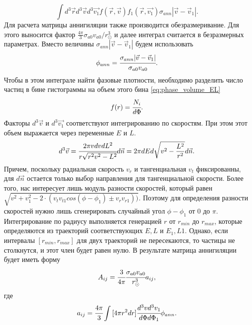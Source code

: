 \begin{equation}
	\label{eq:ann_st}
	\int{d^3\vec{r} d^3\vec{v}  d^3\vec{v_1} 
		f(\vec{r},\vec{v})f_1(\vec{r},\vec{v_1}) \sigma_{ann} 
		|\vec{v}-\vec{v}_1|}.
\end{equation}
Для расчета матрицы аннигиляции также производится обезразмеривание. Для этого выносится фактор $\frac{4\pi}{3}\sigma_{a0}v_{a0}/r_{\odot}^3$ и далее интеграл считается в безразмерных параметрах. Вместо величины $ \sigma_{ann} 
|\vec{v}-\vec{v}_1|$ будем использовать 
\begin{equation}
	\phi_{ann} = \cfrac{\sigma_{ann} |\vec{v}-\vec{v}_1| }{\sigma_{a0}  v_{a0}}.
\end{equation}
Чтобы в этом интеграле найти фазовые плотности, необходимо разделить число частиц в бине гистограммы на объем этого бина \ref{eq:phase_volume_EL}
\begin{equation}
	\label{eq:phase_dens}
	f(r) = \cfrac{N_i}{d\Phi}.
\end{equation}
Факторы $d^3\vec{v}$ и $d^3\vec{v_1}$ соответствуют интегрированию по скоростям. При этом этот объем выражается через переменные $E$ и $L$.
\begin{equation}
	\label{eq:velocity_dens}
	d^{3}\vec{v} = \cfrac{2\pi vdvdL^{2}}{r\sqrt{r^{2}v^{2} - L^{2}}} d\vec{n} = 
	2\pi dEd\sqrt{v^2-\frac{L^2}{r^2}} d\vec{n}.
\end{equation}
Причем, поскольку радиальная скорость $v_r$ и тангенциальная $v_{t}$ фиксированны, для $d\vec{n}$ остается только выбор направления для тангенциальной скорости. Более того, нас интересует лишь модуль разности скоростей, который равен $\sqrt{v^2 + v_{1}^2 - 2\cdot
(v_{t}v_{t1} cos(\phi-\phi_1) \pm v_{r}v_{r1}))}$. Поэтому для определения разности скоростей нужно лишь сгенерировать случайный угол $\phi-\phi_1$ от $0$ до $\pi$.
Интегрирование по радиусу выполняется генерацией $r$ от $r_{min}$ до $r_{max}$, которые определяются из траекторий соответствующих $E, L$ и $E_1, L1$. Однако, если интервалы $[r_{min}, r_{max}]$ для двух траекторий не пересекаются, то частицы не столкнутся, и этот член будет равен нулю.
В результате матрица аннигиляции будет иметь форму
\begin{equation}
	\label{eq:ANN_full}
	A_{ij} = \cfrac{3}{4\pi}\cfrac{\sigma_{a0} v_{a0}}{r_{\odot}^3} a_{ij},
\end{equation}
где
\begin{equation}
	\label{eq:ann_detail}
	a_{ij} =\cfrac{4\pi}{3} \int{[4\pi r^2dr] \cfrac{d^3vd^3v_1}{d\Phi d\Phi_1}} \phi_{ann}.
\end{equation}


